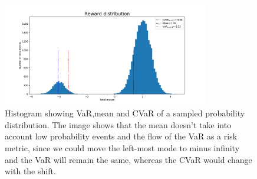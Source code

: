 \begin{figure}[ht]
    \centering
    \includegraphics[width=0.8\textwidth]{images/cvar_motivation2.pdf}
    \caption{Histogram showing VaR,mean and CVaR of a sampled probability distribution.
    The image shows that the mean doesn't take into account low probability events and 
    the flow of
    the VaR as a risk metric, since we could move the left-most mode to minus infinity
    and the VaR will remain the same, whereas the CVaR would change with the shift. }
    \label{cvar_cheetah}

\end{figure}

